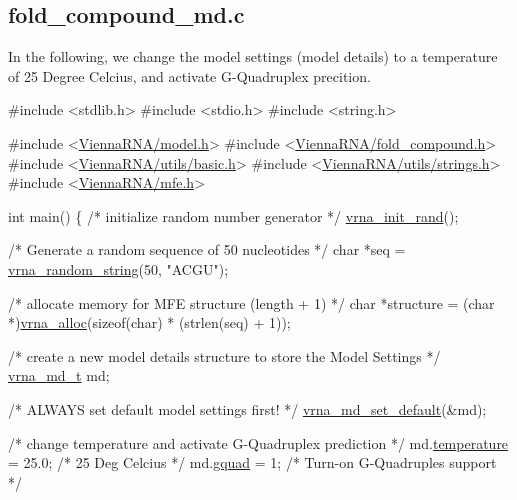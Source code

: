 \subsection*{fold\+\_\+compound\+\_\+md.\+c }

In the following, we change the model settings (model details) to a temperature of 25 Degree Celcius, and activate G-\/\+Quadruplex precition.


\begin{DoxyCodeInclude}
\textcolor{preprocessor}{#include <stdlib.h>}
\textcolor{preprocessor}{#include <stdio.h>}
\textcolor{preprocessor}{#include <string.h>}

\textcolor{preprocessor}{#include <\hyperlink{model_8h}{ViennaRNA/model.h}>}
\textcolor{preprocessor}{#include <\hyperlink{fold__compound_8h}{ViennaRNA/fold\_compound.h}>}
\textcolor{preprocessor}{#include <\hyperlink{utils_2basic_8h}{ViennaRNA/utils/basic.h}>}
\textcolor{preprocessor}{#include <\hyperlink{strings_8h}{ViennaRNA/utils/strings.h}>}
\textcolor{preprocessor}{#include <\hyperlink{mfe_8h}{ViennaRNA/mfe.h}>}

\textcolor{keywordtype}{int}
main()
\{
  \textcolor{comment}{/* initialize random number generator */}
  \hyperlink{group__utils_ga0ad1f40ea316e5c5918695c35613027a}{vrna\_init\_rand}();

  \textcolor{comment}{/* Generate a random sequence of 50 nucleotides */}
  \textcolor{keywordtype}{char}      *seq = \hyperlink{group__string__utils_ga4eeb3750dcf860b9f3158249f95dbd7f}{vrna\_random\_string}(50, \textcolor{stringliteral}{"ACGU"});

  \textcolor{comment}{/* allocate memory for MFE structure (length + 1) */}
  \textcolor{keywordtype}{char}      *structure = (\textcolor{keywordtype}{char} *)\hyperlink{group__utils_gaf37a0979367c977edfb9da6614eebe99}{vrna\_alloc}(\textcolor{keyword}{sizeof}(\textcolor{keywordtype}{char}) * (strlen(seq) + 1));

  \textcolor{comment}{/* create a new model details structure to store the Model Settings */}
  \hyperlink{group__model__details_structvrna__md__s}{vrna\_md\_t} md;

  \textcolor{comment}{/* ALWAYS set default model settings first! */}
  \hyperlink{group__model__details_ga8ac6ff84936282436f822644bf841f66}{vrna\_md\_set\_default}(&md);

  \textcolor{comment}{/* change temperature and activate G-Quadruplex prediction */}
  md.\hyperlink{group__model__details_a5f7e5c2b65bada5188443470e576aa4b}{temperature}  = 25.0; \textcolor{comment}{/* 25 Deg Celcius */}
  md.\hyperlink{group__model__details_af88a511a2b1f526b4c6213de6cb8fd6e}{gquad}        = 1;    \textcolor{comment}{/* Turn-on G-Quadruples support */}


\end{DoxyCodeInclude}
